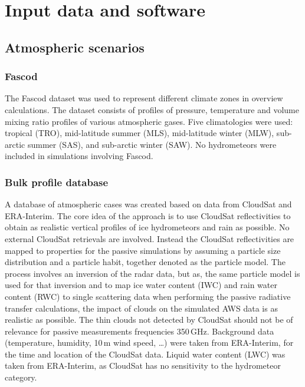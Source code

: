 \documentclass[12pt]{article}
\begin{document}
\section{Input data and software}

\subsection{Atmospheric scenarios}

\subsubsection{Fascod}
\label{sec:fascod}
%
The Fascod dataset \citep{anderson1986afgl} was used to represent different
climate zones in overview calculations. The dataset consists of profiles of
pressure, temperature and volume mixing ratio profiles of various atmospheric
gases. Five climatologies were used: tropical (TRO), mid-latitude summer (MLS),
mid-latitude winter (MLW), sub-arctic summer (SAS), and sub-arctic winter
(SAW). No hydrometeors were included in simulations involving Fascod.


\subsubsection{Bulk profile database}
%
A database of atmospheric cases was created based on data from CloudSat and
ERA-Interim. The core idea of the approach is to use CloudSat reflectivities to
obtain as realistic vertical profiles of ice hydrometeors and rain as
possible. No external CloudSat retrievals are involved. Instead the CloudSat
reflectivities are mapped to properties for the passive simulations by assuming
a particle size distribution and a particle habit, together denoted as
the particle model. The process involves an inversion of the radar data, but as,
the same particle model is used for that inversion and to map ice water content
(IWC) and rain water content (RWC) to single scattering data when performing
the passive radiative transfer calculations, the impact of clouds on the
simulated AWS data is as realistic as possible. The thin clouds not detected by
CloudSat should not be of relevance for passive measurements frequencies
350\,GHz. Background data (temperature, humidity, 10\,m wind speed, \dots) were
taken from ERA-Interim, for the time and location of the CloudSat data. Liquid
water content (LWC) was taken from ERA-Interim, as CloudSat has no sensitivity
to the hydrometeor category.
\end{document}
